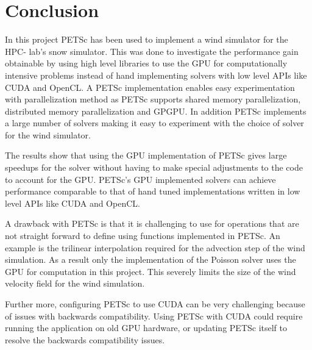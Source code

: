 \chapter{Conclusion}
\label{chap:conclusion}

In this project PETSc has been used to implement a wind simulator for the HPC-
lab's snow simulator. This was done to investigate the performance gain
obtainable by using high level libraries to use the GPU for computationally
intensive problems instead of hand implementing solvers with low level APIs like
CUDA and OpenCL. A PETSc implementation enables easy experimentation with
parallelization method as PETSc supports shared memory parallelization,
distributed memory parallelization and GPGPU. In addition PETSc implements a
large number of solvers making it easy to experiment with the choice of solver
for the wind simulator.

The results show that using the GPU implementation of PETSc gives large speedups
for the solver without having to make special adjustments to the code to account
for the GPU. PETSc's GPU implemented solvers can achieve performance comparable
to that of hand tuned implementations written in low level APIs like CUDA and
OpenCL.

A drawback with PETSc is that it is challenging to use for
operations that are not straight forward to define using functions implemented
in PETSc. An example is the trilinear interpolation required for the advection step of
the wind simulation. As a result only the implementation of the Poisson
solver uses the GPU for computation in this project. This severely limits the
size of the wind velocity field for the wind simulation.

Further more, configuring PETSc to use CUDA can be very challenging because of
issues with backwards compatibility. Using PETSc with CUDA could require running
the application on old GPU hardware, or updating PETSc itself to resolve the
backwards compatibility issues.
